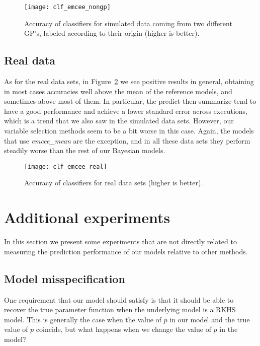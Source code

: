 \begin{figure}[ht!]
  \centering
  \texttt{[image: clf\_emcee\_nongp]}
  \caption{Accuracy of classifiers for simulated data coming from two different GP's, labeled according to their origin (higher is better).}\label{fig:clf_emcee_nongp}
\end{figure}

\subsection*{Real data}

As for the real data sets, in Figure~\ref{fig:clf_emcee_real} we see positive results in general, obtaining in most cases accuracies well above the mean of the reference models, and sometimes above most of them. In particular, the predict-then-summarize tend to have a good performance and achieve a lower standard error across executions, which is a trend that we also saw in the simulated data sets. However, our variable selection methods seem to be a bit worse in this case. Again, the models that use \textit{emcee\_mean} are the exception, and in all these data sets they perform steadily worse than the rest of our Bayesian models.

\begin{figure}[ht!]
  \centering
  \texttt{[image: clf\_emcee\_real]}
  \caption{Accuracy of classifiers for real data sets (higher is better).}\label{fig:clf_emcee_real}
\end{figure}


\section{Additional experiments}

In this section we present some experiments that are not directly related to measuring the prediction performance of our models relative to other methods.

\subsection*{Model misspecification}

One requirement that our model should satisfy is that it should be able to recover the true parameter function when the underlying model is a RKHS model. This is generally the case when the value of \(p\) in our model and the true value of \(p\) coincide, but what happens when we change the value of \(p\) in the model?

